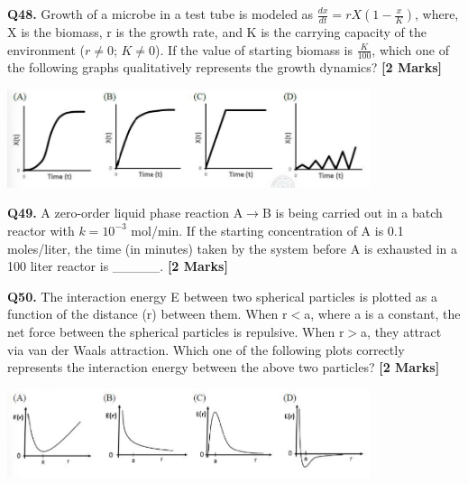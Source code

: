\documentclass[11pt]{article}
\newcommand{\questionb}[2]{
    \noindent\textbf{Q#2.} #1 \hfill \textbf{[2 Marks]}
}
\begin{document}
\questionb{Growth of a microbe in a test tube is modeled as $\frac{dx}{dt} = rX \left(1 - \frac{x}{K}\right)$, where, X is the biomass, r is the growth rate, and K is the carrying capacity of the environment ($r \neq 0$; $K \neq 0$). If the value of starting biomass is $\frac{K}{100}$, which one of the following graphs qualitatively represents the growth dynamics?}{48}
\begin{center}
\includegraphics[width=0.8\textwidth]{figures/48.png}
\end{center}

\vspace{0.5cm}

\questionb{A zero-order liquid phase reaction A$\rightarrow$B is being carried out in a batch reactor with $k = 10^{-3}$ mol/min. If the starting concentration of A is 0.1 moles/liter, the time (in minutes) taken by the system before A is exhausted in a 100 liter reactor is \_\_\_\_\_.}{49}

\vspace{0.5cm}

\questionb{The interaction energy E between two spherical particles is plotted as a function of the distance (r) between them. When r$<$a, where a is a constant, the net force between the spherical particles is repulsive. When r$>$a, they attract via van der Waals attraction. Which one of the following plots correctly represents the interaction energy between the above two particles?}{50}

\begin{center}
\includegraphics[width=0.8\textwidth]{figures/50.png}
\end{center}

\vspace{0.5cm}
\end{document}
